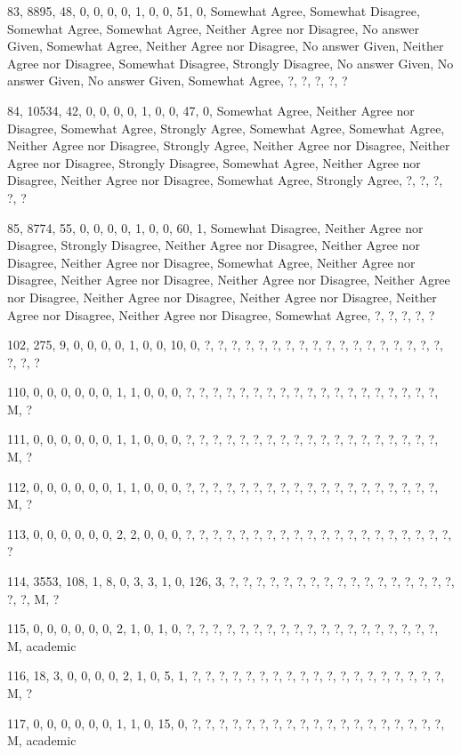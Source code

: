 \documentclass[12pt,twoside]{article}
\begin{document}
83, 8895, 48, 0, 0, 0, 0, 1, 0, 0, 51, 0, Somewhat Agree, Somewhat
Disagree, Somewhat Agree, Somewhat Agree, Neither Agree nor Disagree,
No answer Given, Somewhat Agree, Neither Agree nor Disagree, No answer
Given, Neither Agree nor Disagree, Somewhat Disagree, Strongly
Disagree, No answer Given, No answer Given, No answer Given, Somewhat
Agree, ?, ?, ?, ?, ?

84, 10534, 42, 0, 0, 0, 0, 1, 0, 0, 47, 0, Somewhat Agree, Neither Agree
nor Disagree, Somewhat Agree, Strongly Agree, Somewhat Agree, Somewhat
Agree, Neither Agree nor Disagree, Strongly Agree, Neither Agree nor
Disagree, Neither Agree nor Disagree, Strongly Disagree, Somewhat
Agree, Neither Agree nor Disagree, Neither Agree nor Disagree, Somewhat
Agree, Strongly Agree, ?, ?, ?, ?, ?

85, 8774, 55, 0, 0, 0, 0, 1, 0, 0, 60, 1, Somewhat Disagree, Neither
Agree nor Disagree, Strongly Disagree, Neither Agree nor Disagree,
Neither Agree nor Disagree, Neither Agree nor Disagree, Somewhat Agree,
Neither Agree nor Disagree, Neither Agree nor Disagree, Neither Agree
nor Disagree, Neither Agree nor Disagree, Neither Agree nor Disagree,
Neither Agree nor Disagree, Neither Agree nor Disagree, Neither Agree
nor Disagree, Somewhat Agree, ?, ?, ?, ?, ?

102, 275, 9, 0, 0, 0, 0, 1, 0, 0, 10, 0, ?, ?, ?, ?, ?, ?, ?, ?, ?, ?,
?, ?, ?, ?, ?, ?, ?, ?, ?, ?, ?

110, 0, 0, 0, 0, 0, 0, 1, 1, 0, 0, 0, ?, ?, ?, ?, ?, ?, ?, ?, ?, ?, ?,
?, ?, ?, ?, ?, ?, ?, ?, M, ?

111, 0, 0, 0, 0, 0, 0, 1, 1, 0, 0, 0, ?, ?, ?, ?, ?, ?, ?, ?, ?, ?, ?,
?, ?, ?, ?, ?, ?, ?, ?, M, ?

112, 0, 0, 0, 0, 0, 0, 1, 1, 0, 0, 0, ?, ?, ?, ?, ?, ?, ?, ?, ?, ?, ?,
?, ?, ?, ?, ?, ?, ?, ?, M, ?

113, 0, 0, 0, 0, 0, 0, 2, 2, 0, 0, 0, ?, ?, ?, ?, ?, ?, ?, ?, ?, ?, ?,
?, ?, ?, ?, ?, ?, ?, ?, ?, ?

114, 3553, 108, 1, 8, 0, 3, 3, 1, 0, 126, 3, ?, ?, ?, ?, ?, ?, ?, ?, ?,
?, ?, ?, ?, ?, ?, ?, ?, ?, ?, M, ?

115, 0, 0, 0, 0, 0, 0, 2, 1, 0, 1, 0, ?, ?, ?, ?, ?, ?, ?, ?, ?, ?, ?,
?, ?, ?, ?, ?, ?, ?, ?, M, academic

116, 18, 3, 0, 0, 0, 0, 2, 1, 0, 5, 1, ?, ?, ?, ?, ?, ?, ?, ?, ?, ?, ?,
?, ?, ?, ?, ?, ?, ?, ?, M, ?

117, 0, 0, 0, 0, 0, 0, 1, 1, 0, 15, 0, ?, ?, ?, ?, ?, ?, ?, ?, ?, ?, ?,
?, ?, ?, ?, ?, ?, ?, ?, M, academic
\end{document}
